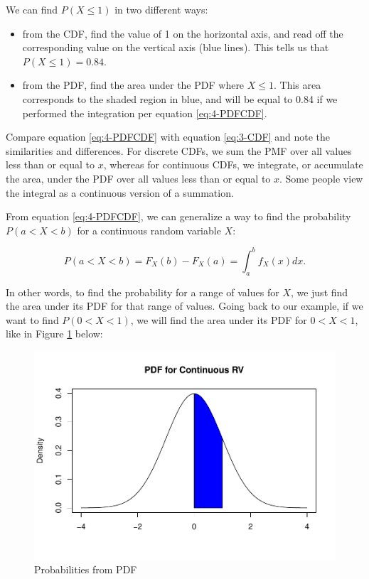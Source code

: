 \documentclass[
]{book}
\providecommand{\tightlist}{%
  \setlength{\itemsep}{0pt}\setlength{\parskip}{0pt}}
\begin{document}
We can find \(P(X \leq 1)\) in two different ways:

\begin{itemize}
\tightlist
\item
  from the CDF, find the value of 1 on the horizontal axis, and read off the corresponding value on the vertical axis (blue lines). This tells us that \(P(X \leq 1) = 0.84\).
\item
  from the PDF, find the area under the PDF where \(X \leq 1\). This area corresponds to the shaded region in blue, and will be equal to 0.84 if we performed the integration per equation \eqref{eq:4-PDFCDF}.
\end{itemize}

Compare equation \eqref{eq:4-PDFCDF} with equation \eqref{eq:3-CDF} and note the similarities and differences. For discrete CDFs, we sum the PMF over all values less than or equal to \(x\), whereas for continuous CDFs, we integrate, or accumulate the area, under the PDF over all values less than or equal to \(x\). Some people view the integral as a continuous version of a summation.

From equation \eqref{eq:4-PDFCDF}, we can generalize a way to find the probability \(P(a<X<b)\) for a continuous random variable \(X\):

\begin{equation} 
P(a<X<b) = F_X(b) - F_X(a) = \int_{a}^{b} f_X(x) dx.
\label{eq:4-integrate}
\end{equation}

In other words, to find the probability for a range of values for \(X\), we just find the area under its PDF for that range of values. Going back to our example, if we want to find \(P(0<X<1)\), we will find the area under its PDF for \(0<X<1\), like in Figure \ref{fig:4-prob2} below:

\begin{figure}
\centering
\includegraphics{bookdown-demo_files/figure-latex/4-prob2-1.pdf}
\caption{\label{fig:4-prob2}Probabilities from PDF}
\end{figure}
\end{document}
